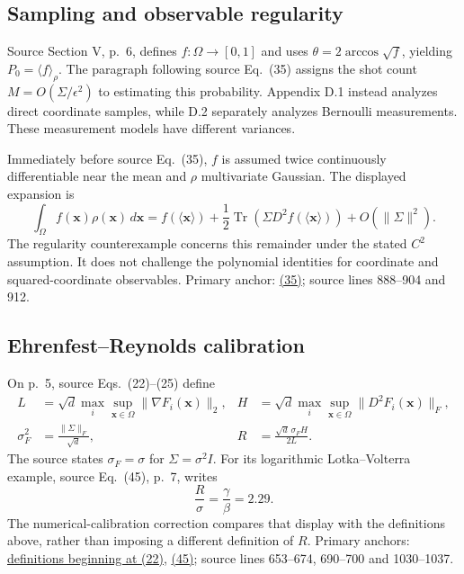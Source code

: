 \subsection{Sampling and observable regularity}
Source Section V, p.~6, defines $f:\Omega\to[0,1]$ and uses
$\theta=2\arccos\sqrt f$, yielding $P_0=\langle f\rangle_\rho$.
The paragraph following source Eq.~(35) assigns the shot count
$M=O(\Sigma/\epsilon^2)$ to estimating this probability. Appendix D.1 instead
analyzes direct coordinate samples, while D.2 separately analyzes Bernoulli
measurements. These measurement models have different variances.

Immediately before source Eq.~(35), $f$ is assumed twice continuously
differentiable near the mean and $\rho$ multivariate Gaussian. The displayed
expansion is
\[
\int_\Omega f(\mathbf x)\rho(\mathbf x)\,d\mathbf x
=f(\langle\mathbf x\rangle)
+\frac12\operatorname{Tr}\!\left(\Sigma D^2f(\langle\mathbf x\rangle)\right)
+O(\|\Sigma\|^2).
\]
The regularity counterexample concerns this remainder under the stated
$C^2$ assumption. It does not challenge the polynomial identities for
coordinate and squared-coordinate observables.
Primary anchor:
\href{https://arxiv.org/html/2609.28999v2#S5.E35}{(35)};
source lines 888--904 and 912.

\subsection{Ehrenfest--Reynolds calibration}
On p.~5, source Eqs.~(22)--(25) define
\begin{align*}
L&=\sqrt d\max_i\sup_{\mathbf x\in\Omega}\|\nabla F_i(\mathbf x)\|_2,
&H&=\sqrt d\max_i\sup_{\mathbf x\in\Omega}\|D^2F_i(\mathbf x)\|_F,\\
\sigma_F^2&=\frac{\|\Sigma\|_F}{\sqrt d},
&R&=\frac{\sqrt d\,\sigma_F H}{2L}.
\end{align*}
The source states $\sigma_F=\sigma$ for $\Sigma=\sigma^2I$.
For its logarithmic Lotka--Volterra example, source Eq.~(45), p.~7, writes
\[
\frac R\sigma=\frac\gamma\beta=2.29.
\]
The numerical-calibration correction compares that display with the definitions
above, rather than imposing a different definition of $R$.
Primary anchors:
\href{https://arxiv.org/html/2609.28999v2#S4.E22}{definitions beginning at (22)},
\href{https://arxiv.org/html/2609.28999v2#S6.E45}{(45)};
source lines 653--674, 690--700 and 1030--1037.


